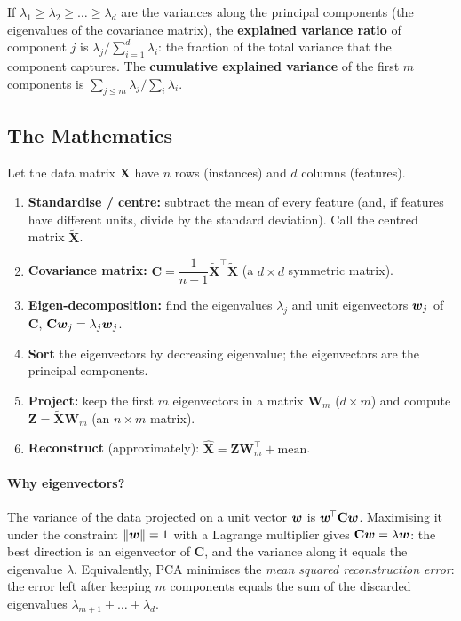 \begin{definition}
If $\lambda_1\ge\lambda_2\ge\dots\ge\lambda_d$ are the variances along the principal components (the eigenvalues of the covariance matrix), the \textbf{explained variance ratio} of component $j$ is $\lambda_j\big/\sum_{i=1}^{d}\lambda_i$: the fraction of the total variance that the component captures. The \textbf{cumulative explained variance} of the first $m$ components is $\sum_{j\le m}\lambda_j\big/\sum_{i}\lambda_i$.
\end{definition}

\subsection{The Mathematics}

Let the data matrix $\mathbf X$ have $n$ rows (instances) and $d$ columns (features).

\begin{definition}
\begin{enumerate}
  \item \textbf{Standardise / centre:} subtract the mean of every feature (and, if features have different units, divide by the standard deviation). Call the centred matrix $\tilde{\mathbf X}$.
  \item \textbf{Covariance matrix:} $\mathbf C=\dfrac{1}{n-1}\tilde{\mathbf X}^{\!\top}\tilde{\mathbf X}$ (a $d\times d$ symmetric matrix).
  \item \textbf{Eigen-decomposition:} find the eigenvalues $\lambda_j$ and unit eigenvectors $\boldsymbol{w}_j$ of $\mathbf C$, $\mathbf C\boldsymbol{w}_j=\lambda_j\boldsymbol{w}_j$.
  \item \textbf{Sort} the eigenvectors by decreasing eigenvalue; the eigenvectors are the principal components.
  \item \textbf{Project:} keep the first $m$ eigenvectors in a matrix $\mathbf W_m$ ($d\times m$) and compute $\mathbf Z=\tilde{\mathbf X}\mathbf W_m$ (an $n\times m$ matrix).
  \item \textbf{Reconstruct} (approximately): $\hat{\mathbf X}=\mathbf Z\mathbf W_m^{\!\top}+\text{mean}$.
\end{enumerate}
\end{definition}

\paragraph{Why eigenvectors?} The variance of the data projected on a unit vector $\boldsymbol{w}$ is $\boldsymbol{w}^{\!\top}\mathbf C\boldsymbol{w}$. Maximising it under the constraint $\|\boldsymbol{w}\|=1$ with a Lagrange multiplier gives $\mathbf C\boldsymbol{w}=\lambda\boldsymbol{w}$: the best direction is an eigenvector of $\mathbf C$, and the variance along it equals the eigenvalue $\lambda$. Equivalently, PCA minimises the \emph{mean squared reconstruction error}: the error left after keeping $m$ components equals the sum of the discarded eigenvalues $\lambda_{m+1}+\dots+\lambda_d$.

